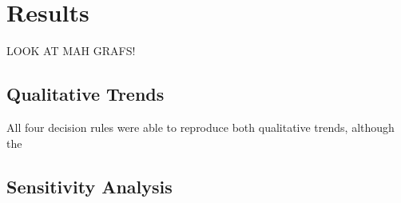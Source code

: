 \section{Results}
\label{sec:results}

LOOK AT MAH GRAFS!

\subsection{Qualitative Trends}
\label{sub:qt_results}

All four decision rules were able to reproduce both qualitative trends, although the

\subsection{Sensitivity Analysis}
\label{sub:sa_results}


